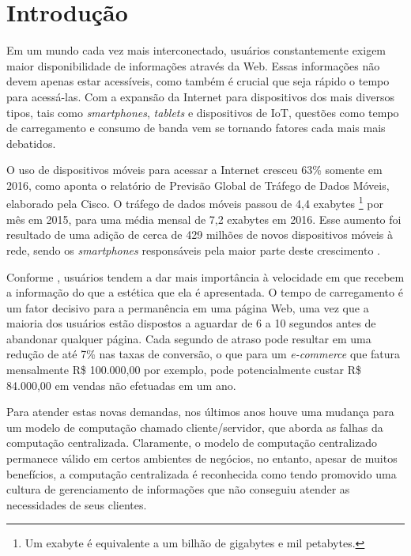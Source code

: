 \chapter[Introdução]{Introdução}

Em um mundo cada vez mais interconectado, usuários constantemente exigem maior disponibilidade de informações através da Web. Essas informações não devem apenas estar acessíveis, como também é crucial que seja rápido o tempo para acessá-las. Com a expansão da Internet para dispositivos dos mais diversos tipos, tais como \textit{smartphones}, \textit{tablets} e dispositivos de IoT, questões como tempo de carregamento e consumo de banda vem se tornando fatores cada mais mais debatidos.

O uso de dispositivos móveis para acessar a Internet cresceu 63\% somente em 2016, como aponta o relatório de Previsão Global de Tráfego de Dados Móveis, elaborado pela Cisco. O tráfego de dados móveis passou de  4,4 exabytes \footnote{Um exabyte é equivalente a um bilhão de gigabytes e mil petabytes.} por mês em 2015, para uma média mensal de 7,2 exabytes em 2016. Esse aumento foi resultado de uma adição de cerca de 429 milhões de novos dispositivos móveis à rede, sendo os \textit{smartphones} responsáveis pela maior parte deste crescimento \cite{cisco-network-report}.

Conforme , usuários tendem a dar mais importância à velocidade em que recebem a informação do que a estética que ela é apresentada. O tempo de carregamento é um fator decisivo para a permanência em uma página Web, uma vez que a maioria dos usuários estão dispostos a aguardar de 6 a 10 segundos antes de abandonar qualquer página. Cada segundo de atraso pode resultar em uma redução de até 7\% nas taxas de conversão, o que para um \textit{e-commerce} que fatura mensalmente R\$ 100.000,00 por exemplo, pode potencialmente custar R\$ 84.000,00 em vendas não efetuadas em um ano.

Para atender estas novas demandas, nos últimos anos houve uma mudança para um modelo de computação chamado cliente/servidor, que aborda as falhas da computação centralizada. Claramente, o modelo de computação centralizado permanece válido em certos ambientes de negócios, no entanto, apesar de muitos benefícios, a computação centralizada é reconhecida como tendo promovido uma cultura de gerenciamento de informações que não conseguiu atender as necessidades de seus clientes.

